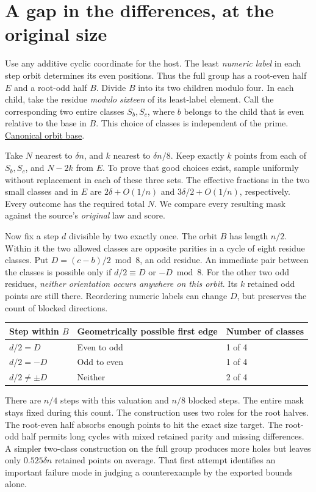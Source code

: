 \documentclass[12pt,letterpaper]{article}
\newcommand{\orig}[3]{\href{https://github.com/nousentllc/riemann-hypothesis/blob/40e56bab026552e089d7afcfeff08d2defb9c005/src/#1.lean\#L#2}{#3}}
\newcommand{\pagepart}[1]{\clearpage\section{#1}}
\begin{document}
\pagepart{A gap in the differences, at the original size}
Use any additive cyclic coordinate for the host. The least \emph{numeric label} in each step orbit determines its even positions. Thus the full group has a root-even half \(E\) and a root-odd half \(B\). Divide \(B\) into its two children modulo four. In each child, take the residue \emph{modulo sixteen} of its least-label element. Call the corresponding two entire classes \(S_b,S_c\), where \(b\) belongs to the child that is even relative to the base in \(B\). This choice of classes is independent of the prime.
\orig{Formalism/LocalToGlobal/GlobalTheory/IsResidueClassZero}{267}{Canonical orbit base}.

Take \(N\) nearest to \(\delta n\), and \(k\) nearest to \(\delta n/8\). Keep exactly \(k\) points from each of \(S_b,S_c\), and \(N-2k\) from \(E\). To prove that good choices exist, sample uniformly without replacement in each of these three sets. The effective fractions in the two small classes and in \(E\) are \(2\delta+O(1/n)\) and \(3\delta/2+O(1/n)\), respectively. Every outcome has the required total \(N\). We compare every resulting mask against the source's \emph{original} law and score.

Now fix a step \(d\) divisible by two exactly once. The orbit \(B\) has length \(n/2\). Within it the two allowed classes are opposite parities in a cycle of eight residue classes. Put \(D=(c-b)/2\bmod 8\), an odd residue. An immediate pair between the classes is possible only if \(d/2\equiv D\) or \(-D\bmod 8\). For the other two odd residues, \emph{neither orientation occurs anywhere on this orbit}. Its \(k\) retained odd points are still there. Reordering numeric labels can change \(D\), but preserves the count of blocked directions.

\begin{center}\begin{tabular}{@{}lll@{}}\toprule
Step within \(B\) & Geometrically possible first edge & Number of classes\\\midrule
\(d/2=D\) & Even to odd & 1 of 4\\
\(d/2=-D\) & Odd to even & 1 of 4\\
\(d/2\ne\pm D\) & Neither & 2 of 4\\\bottomrule
\end{tabular}\end{center}

There are \(n/4\) steps with this valuation and \(n/8\) blocked steps. The entire mask stays fixed during this count. The construction uses two roles for the root halves. The root-even half absorbs enough points to hit the exact size target. The root-odd half permits long cycles with mixed retained parity and missing differences. A simpler two-class construction on the full group produces more holes but leaves only \(0.525\delta n\) retained points on average. That first attempt identifies an important failure mode in judging a counterexample by the exported bounds alone.
\end{document}

